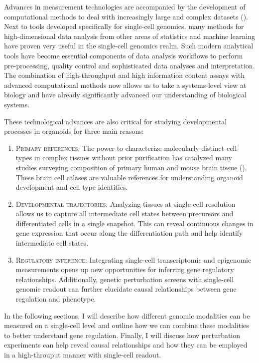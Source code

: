 Advances in measurement technologies are accompanied by the development of computational methods to deal with increasingly large and complex datasets (\cite{zappia_exploring_2018}). Next to tools developed specifically for single-cell genomics, many methods for high-dimensional data analysis from other areas of statistics and machine learning have proven very useful in the single-cell genomics realm. Such modern analytical tools have become essential components of data analysis workflows to perform pre-processing, quality control and sophisticated data analyses and interpretation. The combination of high-throughput and high information content assays with advanced computational methods now allows us to take a systems-level view at biology and have already significantly advanced our understanding of biological systems.

These technological advances are also critical for studying developmental processes in organoids for three main reasons:

\begin{enumerate}
    \item {\scshape Primary references}: The power to characterize molecularly distinct cell types in complex tissues without prior purification has catalyzed many studies surveying composition of primary human and mouse brain tissue (\cite{la_manno_molecular_2021,zeisel_molecular_2018,polioudakis_single-cell_2019,mayer_developmental_2018}). These brain cell atlases are valuable references for understanding organoid development and cell type identities.
    \item {\scshape Developmental trajectories}: Analyzing tissues at single-cell resolution allows us to capture all intermediate cell states between precursors and differentiated cells in a single snapshot. This can reveal continuous changes in gene expression that occur along the differentiation path and help identify intermediate cell states. 
    \item {\scshape Regulatory inference}: Integrating single-cell transcriptomic and epigenomic measurements opens up new opportunities for inferring gene regulatory relationships. Additionally, genetic perturbation screens with single-cell genomic readout can further elucidate causal relationships between gene regulation and phenotype.
  \end{enumerate}

In the following sections, I will describe how different genomic modalities can be measured on a single-cell level and outline how we can combine these modalities to better understand gene regulation. Finally, I will discuss how perturbation experiments can help reveal causal relationships and how they can be employed in a high-throuput manner with single-cell readout.


